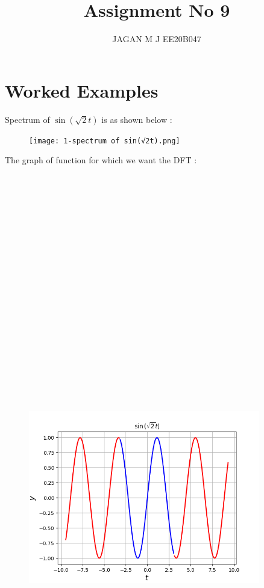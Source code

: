 \documentclass[10pt,a4paper]{article}
\begin{document}
\title{Assignment No 9}
\author{JAGAN M J EE20B047}
\maketitle


\section{Worked Examples}
Spectrum of $\sin( \sqrt{2}t)$ is as shown below : 

\begin{figure}[!tbh]

\texttt{[image: 1-spectrum of sin(√2t).png]}

\end{figure}

The graph of function for which we want the DFT : \\\\\\\\\\\\\\\\\\\\\\\\\\\\\\\\\\\\\\\\\\

\begin{figure}[!tbh]

\includegraphics[width = 0.9\textwidth]{1-time function over several periods.png}

\end{figure}
\end{document}
